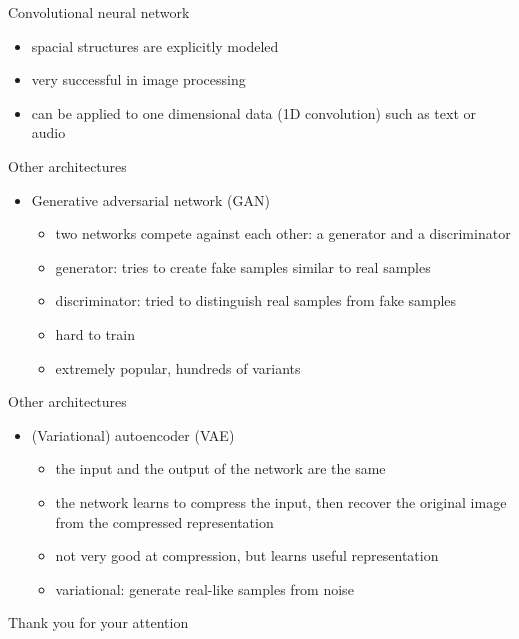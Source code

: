 \documentclass[bigger]{beamer}
\begin{document}
\begin{frame}{Convolutional neural network}
    \begin{itemize}
        \item spacial structures are explicitly modeled
        \item very successful in image processing
        \item can be applied to one dimensional data (1D convolution) such as text or audio
    \end{itemize}
\end{frame}

\begin{frame}{Other architectures}
    \begin{itemize}
        \item Generative adversarial network (GAN)
            \begin{itemize}
                \item two networks compete against each other: a generator and a discriminator
                \item generator: tries to create fake samples similar to real samples
                \item discriminator: tried to distinguish real samples from fake samples
                \item hard to train
                \item extremely popular, hundreds of variants
            \end{itemize}
    \end{itemize}
\end{frame}

\begin{frame}{Other architectures}
    \begin{itemize}
        \item (Variational) autoencoder (VAE)
            \begin{itemize}
                \item the input and the output of the network are the same
                \item the network learns to compress the input, then recover the original image from the compressed representation
                \item not very good at compression, but learns useful representation
                \item variational: generate real-like samples from noise
            \end{itemize}
    \end{itemize}
\end{frame}

\begin{frame}{Thank you for your attention}
	
\end{frame}
\end{document}
